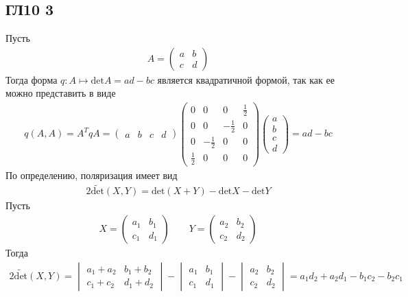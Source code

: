\subsection*{ГЛ10 3}
Пусть 
\begin{gather*}
	A = 
	\begin{pmatrix}
		a & b \\
		c & d
	\end{pmatrix}
\end{gather*}
Тогда форма $q: A \mapsto \text{det} A = ad-bc$ является квадратичной формой, так как ее можно представить в виде 
\begin{gather*}
	q(A, A)=A^TqA=
	\begin{pmatrix}
		a & b & c & d
	\end{pmatrix}
	\begin{pmatrix}
		0 & 0 & 0 & \frac{1}{2} \\
		0 & 0 & -\frac{1}{2} & 0\\
		0 & -\frac{1}{2} & 0 & 0 \\
		\frac{1}{2} & 0 & 0 & 0
	\end{pmatrix}
	\begin{pmatrix}
		a\\ b\\ c\\	d
	\end{pmatrix}
	=ad-bc
\end{gather*}
По определению, поляризация имеет вид 
\begin{gather*}
	2 \widetilde{\text{det}}(X, Y)=\text{det}(X+Y)-\text{det}X-\text{det}Y
\end{gather*}
Пусть 
\begin{gather*}
	X = 
	\begin{pmatrix}
		a_1 & b_1 \\
		c_1 & d_1
	\end{pmatrix}
	\qquad
	Y = 
	\begin{pmatrix}
		a_2 & b_2 \\
		c_2 & d_2
	\end{pmatrix}
\end{gather*}
Тогда 
\begin{gather*}
	2\widetilde{\text{det}}(X, Y)=
	\begin{vmatrix}
		a_1 + a_2 & b_1 + b_2 \\
		c_1 + c_2 & d_1 + d_2
	\end{vmatrix}
	-
	\begin{vmatrix}
		a_1 & b_1 \\
		c_1 & d_1
	\end{vmatrix}
	-
	\begin{vmatrix}
		a_2 & b_2 \\
		c_2 & d_2
	\end{vmatrix}
	=
	a_1d_2+a_2d_1-b_1c_2-b_2c_1
\end{gather*}

